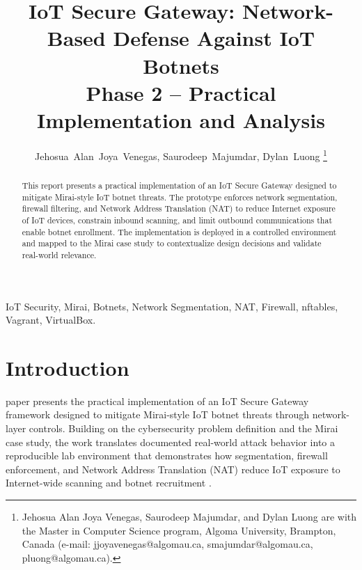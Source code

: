 \documentclass[journal]{IEEEtran}
\begin{document}
\title{IoT Secure Gateway: Network-Based Defense Against IoT Botnets\\Phase 2 -- Practical Implementation and Analysis}

\author{Jehosua~Alan~Joya~Venegas,
        Saurodeep~Majumdar,
        Dylan~Luong%
\thanks{Jehosua Alan Joya Venegas, Saurodeep Majumdar, and Dylan Luong are with the Master in Computer Science program, Algoma University, Brampton, Canada (e-mail: jjoyavenegas@algomau.ca, smajumdar@algomau.ca, pluong@algomau.ca).}%
}

\maketitle

\begin{abstract}
This report presents a practical implementation of an IoT Secure Gateway designed to mitigate Mirai-style IoT botnet threats. The prototype enforces network segmentation, firewall filtering, and Network Address Translation (NAT) to reduce Internet exposure of IoT devices, constrain inbound scanning, and limit outbound communications that enable botnet enrollment. The implementation is deployed in a controlled environment and mapped to the Mirai case study to contextualize design decisions and validate real-world relevance.
\end{abstract}

\begin{IEEEkeywords}
IoT Security, Mirai, Botnets, Network Segmentation, NAT, Firewall, nftables, Vagrant, VirtualBox.
\end{IEEEkeywords}

\section{Introduction}
 paper presents the practical implementation of an IoT Secure Gateway framework designed to mitigate Mirai-style IoT botnet threats through network-layer controls. Building on the cybersecurity problem definition and the Mirai case study, the work translates documented real-world attack behavior into a reproducible lab environment that demonstrates how segmentation, firewall enforcement, and Network Address Translation (NAT) reduce IoT exposure to Internet-wide scanning and botnet recruitment \cite{mirai_usenix}.
\end{document}

